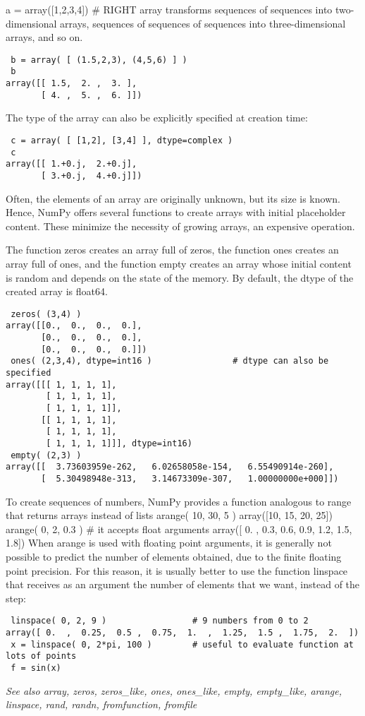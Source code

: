  a = array([1,2,3,4])  # RIGHT
array transforms sequences of sequences into two-dimensional arrays, sequences of sequences of sequences into three-dimensional arrays, and so on.
\begin{verbatim}
 b = array( [ (1.5,2,3), (4,5,6) ] )
 b
array([[ 1.5,  2. ,  3. ],
       [ 4. ,  5. ,  6. ]])
\end{verbatim}
The type of the array can also be explicitly specified at creation time:
\begin{verbatim}
 c = array( [ [1,2], [3,4] ], dtype=complex )
 c
array([[ 1.+0.j,  2.+0.j],
       [ 3.+0.j,  4.+0.j]])
\end{verbatim}
Often, the elements of an array are originally unknown, but its size is known. Hence, NumPy offers several functions to create arrays with initial placeholder content. These minimize the necessity of growing arrays, an expensive operation.

The function zeros creates an array full of zeros, the function ones creates an array full of ones, and the function empty creates an array whose initial content is random and depends on the state of the memory. By default, the dtype of the created array is float64.
\begin{verbatim}
 zeros( (3,4) )
array([[0.,  0.,  0.,  0.],
       [0.,  0.,  0.,  0.],
       [0.,  0.,  0.,  0.]])
 ones( (2,3,4), dtype=int16 )                # dtype can also be specified
array([[[ 1, 1, 1, 1],
        [ 1, 1, 1, 1],
        [ 1, 1, 1, 1]],
       [[ 1, 1, 1, 1],
        [ 1, 1, 1, 1],
        [ 1, 1, 1, 1]]], dtype=int16)
 empty( (2,3) )
array([[  3.73603959e-262,   6.02658058e-154,   6.55490914e-260],
       [  5.30498948e-313,   3.14673309e-307,   1.00000000e+000]])
\end{verbatim}
To create sequences of numbers, NumPy provides a function analogous to range that returns arrays instead of lists
 arange( 10, 30, 5 )
array([10, 15, 20, 25])
 arange( 0, 2, 0.3 )                 # it accepts float arguments
array([ 0. ,  0.3,  0.6,  0.9,  1.2,  1.5,  1.8])
When arange is used with floating point arguments, it is generally not possible to predict the number of elements obtained, due to the finite floating point precision. For this reason, it is usually better to use the function linspace that receives as an argument the number of elements that we want, instead of the step:

\begin{verbatim}
 linspace( 0, 2, 9 )                 # 9 numbers from 0 to 2
array([ 0.  ,  0.25,  0.5 ,  0.75,  1.  ,  1.25,  1.5 ,  1.75,  2.  ])
 x = linspace( 0, 2*pi, 100 )        # useful to evaluate function at lots of points
 f = sin(x)
\end{verbatim}
\textit{See also
array, zeros, zeros_like, ones, ones_like, empty, empty_like, arange, linspace, rand, randn, fromfunction, fromfile}


